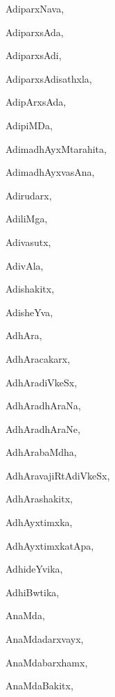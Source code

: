 \begin{multicols}{3}
{\noindent
{AdiparxNava}, \pageref{AdiparxNava}

\noindent
{AdiparxsAda}, \pageref{AdiparxsAda}

\noindent
{AdiparxsAdi}, \pageref{AdiparxsAdi}

\noindent
{AdiparxsAdisathxla}, \pageref{AdiparxsAdisathxla}

\noindent
{AdipArxsAda}, \pageref{AdipArxsAda}

\noindent
{AdipiMDa}, \pageref{AdipiMDa}

\noindent
{AdimadhAyxMtarahita}, \pageref{AdimadhAyxMtarahita}

\noindent
{AdimadhAyxvasAna}, \pageref{AdimadhAyxvasAna}

\noindent
{Adirudarx}, \pageref{Adirudarx}

\noindent
{AdiliMga}, \pageref{AdiliMga}

\noindent
{Adivasutx}, \pageref{Adivasutx}

\noindent
{AdivAla}, \pageref{AdivAla}

\noindent
{Adishakitx}, \pageref{Adishakitx}

\noindent
{AdisheYva}, \pageref{AdisheYva}

\noindent
{AdhAra}, \pageref{AdhAra}

\noindent
{AdhAracakarx}, \pageref{AdhAracakarx}

\noindent
{AdhAradiVkeSx}, \pageref{AdhAradiVkeSx}

\noindent
{AdhAradhAraNa}, \pageref{AdhAradhAraNa}

\noindent
{AdhAradhAraNe}, \pageref{AdhAradhAraNe}

\noindent
{AdhArabaMdha}, \pageref{AdhArabaMdha}

\noindent
{AdhAravajiRtAdiVkeSx}, \pageref{AdhAravajiRtAdiVkeSx}

\noindent
{AdhArashakitx}, \pageref{AdhArashakitx}

\noindent
{AdhAyxtimxka}, \pageref{AdhAyxtimxka}

\noindent
{AdhAyxtimxkatApa}, \pageref{AdhAyxtimxkatApa}

\noindent
{AdhideYvika}, \pageref{AdhideYvika}

\noindent
{AdhiBwtika}, \pageref{AdhiBwtika}

\noindent
{AnaMda}, \pageref{AnaMda}

\noindent
{AnaMdadarxvayx}, \pageref{AnaMdadarxvayx}

\noindent
{AnaMdabarxhamx}, \pageref{AnaMdabarxhamx}

\noindent
{AnaMdaBakitx}, \pageref{AnaMdaBakitx}

}
\end{multicols}
